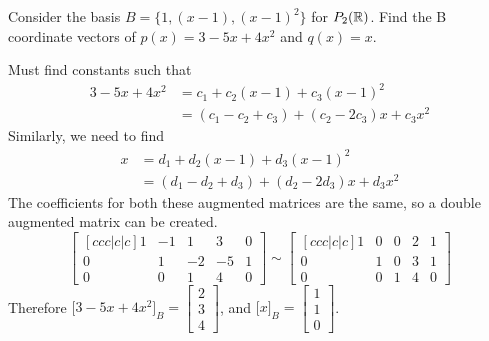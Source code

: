 \documentclass[english, 12pt]{article}
\begin{document}
\begin{exmp}
Consider the basis $B = \{1,(x-1),(x-1)^2\}$ for $P_2({\mathbb{R}})$. Find the B coordinate vectors of $p(x) = 3 - 5x + 4x^2$ and $q(x) = x$.
\begin{sol}
Must find constants such that
\begin{align*}
3 - 5x + 4x^2 &= c_{1} + c_{2} (x-1) + c_{3} (x-1)^2 \\
&= (c_1 - c_2 + c_3) + (c_2 - 2c_3)x + c_3 x^2
\end{align*}
Similarly, we need to find
\begin{align*}
x &= d_1 + d_2(x-1) + d_3 (x-1)^2\\
&= (d_1 - d_2 + d_3) + (d_2 - 2d_3)x + d_3 x^2
\end{align*}
The coefficients for both these augmented matrices are the same, so a double augmented matrix can be created.
\[\begin{bmatrix}[ccc|c|c] 1 & -1 & 1 & 3 & 0 \\ 0 & 1 & -2 & -5 & 1 \\ 0 & 0 & 1 & 4 & 0 \end{bmatrix} \sim \begin{bmatrix}[ccc|c|c] 1 & 0 & 0 & 2 & 1 \\ 0 & 1 & 0 & 3 & 1 \\ 0 & 0 & 1 & 4 & 0 \end{bmatrix}\]
Therefore $\lbrack 3 - 5x + 4x^2 \rbrack_B = \begin{bmatrix} 2 \\ 3 \\ 4 \end{bmatrix}$, and $\lbrack x \rbrack_B = \begin{bmatrix} 1 \\ 1 \\ 0 \end{bmatrix}$.
\end{sol}
\end{exmp}
\end{document}

